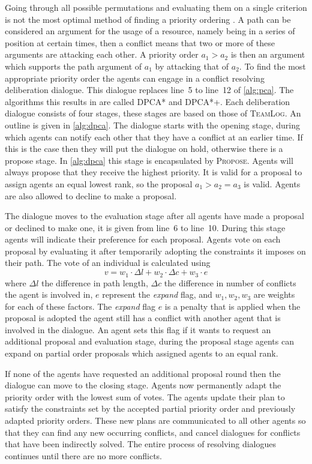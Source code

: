 Going through all possible permutations and evaluating them on a single
criterion is not the most optimal method of finding a priority ordering
\cite{bennewitz2002}. A path can be considered an argument for the usage of a 
resource, namely being in a series of position at certain times, then a 
conflict means that two or more of these arguments are attacking each other. A 
priority order $a_1 > a_2$ is then an argument which supports the path argument 
of $a_1$ by attacking that of $a_2$. To find the most appropriate priority 
order the agents can engage in a conflict resolving deliberation dialogue. This 
dialogue replaces line~5 to line~12 of \autoref{alg:pca}.
The algorithms this results in are called DPCA* and DPCA*+. Each deliberation 
dialogue consists of four stages, these stages are based on those of 
\textsc{TeamLog}. An outline is given in \autoref{alg:dpca}. The dialogue 
starts with the opening stage, during which agents can notify each other that 
they have a conflict at an earlier time. If this is the case then they will put 
the dialogue on hold, otherwise there is a propose stage. In \autoref{alg:dpca} 
this stage is encapsulated by \textsc{Propose}. Agents will always propose that 
they receive the highest priority. It is valid for a proposal to assign agents 
an equal lowest rank, so the proposal $a_1 > a_2 = a_3$ is valid. Agents are 
also allowed to decline to make a proposal.

The dialogue moves to the evaluation stage after all agents have made a 
proposal or declined to make one, it is given from line~6 to line~10. During 
this stage agents will indicate their preference for each proposal. 
Agents vote on each proposal by evaluating it after temporarily adopting 
the constraints it imposes on their path. The vote of an individual is 
calculated using
\[ v = w_1 \cdot \Delta l + w_2 \cdot \Delta c + w_3 \cdot e \]
where $\Delta l$ the difference in path length, $\Delta c$ the difference in 
number of conflicts the agent is involved in, $e$ represent the \emph{expand} 
flag, and $w_1, w_2, w_3$ are weights for each of these factors. The 
\emph{expand} flag $e$ is a penalty that is applied when the proposal is 
adopted the agent still has a conflict with another agent that is involved in 
the dialogue. An agent sets this flag if it wants to request an additional 
proposal and evaluation stage, during the proposal stage agents can expand on 
partial order proposals which assigned agents to an equal rank.

If none of the agents have requested an additional proposal round then the 
dialogue can move to the closing stage. Agents now permanently adapt the 
priority order with the lowest sum of votes. The agents update their plan to 
satisfy the constraints set by the accepted partial priority order and 
previously adapted priority orders. These new 
plans are communicated to all other agents so that they can find any new 
occurring conflicts, and cancel dialogues for conflicts that have been 
indirectly solved. The entire process of resolving dialogues 
continues until there are no more conflicts.

